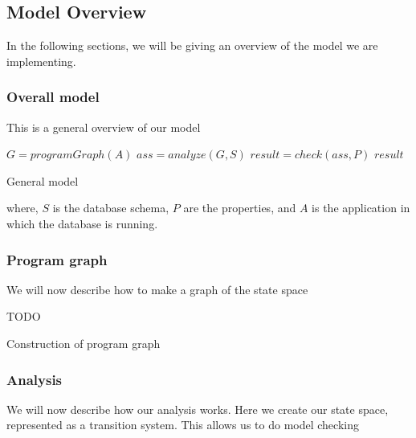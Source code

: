 \subsection{Model Overview}\label{subsec:model-overview}

In the following sections, we will be giving an overview of the model we are implementing.

\subsubsection{Overall model}\label{subsubsec:overall-model}

This is a general overview of our model

\begin{algorithm}[htb!]
    \begin{codebox}
        \li $G = programGraph(A)$
        \li $ass = analyze(G,S)$
        \li $result = check(ass,P)$
        \li \Return $result$
    \end{codebox}
    \caption{General model}
    \label{alg:model}
\end{algorithm}
\noindent where, $S$ is the database schema, $P$ are the properties, and $A$ is the application in which the database is running.

\subsubsection{Program graph}\label{subsubsec:program-graph}

We will now describe how to make a graph of the state space

\begin{algorithm}[htb!]
    \begin{codebox}
        \li TODO
    \end{codebox}
    \caption{Construction of program graph}
    \label{alg:program-graph}
\end{algorithm}

\subsubsection{Analysis}\label{subsubsec:analysis}

We will now describe how our analysis works.
Here we create our state space, represented as a transition system.
This allows us to do model checking

